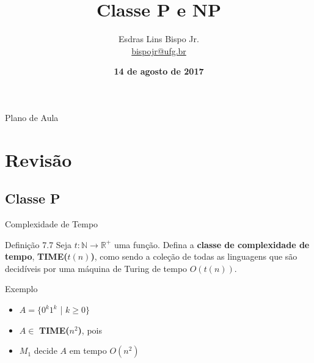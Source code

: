 \documentclass[xcolor=dvipsnames,table]{beamer}
\title{Classe P e NP}
\author{
  Esdras Lins Bispo Jr. \\ \url{bispojr@ufg.br}
  }
\institute{
  Teoria da Computação \\Bacharelado em Ciência da Computação}
\date{\textbf{14 de agosto de 2017} }
\begin{document}
	\begin{frame}
		\titlepage
	\end{frame}

	\AtBeginSection{
		\begin{frame}{Sumário}%
    		\tableofcontents[currentsection]
		\end{frame}
	}

	\begin{frame}{Plano de Aula}
		\tableofcontents
	\end{frame}
    
    \section{Revisão}
	\subsection{Classe P}	
	\begin{frame}{Complexidade de Tempo}
		\begin{block}{Definição 7.7}
			Seja $t: \mathbb{N} \rightarrow \mathbb{R}^+$ uma função. Defina a {\bf classe de complexidade de tempo}, {\bf TIME($t(n)$)}, como sendo a coleção de todas as linguagens que são decidíveis por uma máquina de Turing de tempo $O(t(n))$.
		\end{block}   
		\begin{block}{Exemplo}
			\begin{itemize}
				\item $A = \{ 0^k 1^k$ | $k \geq 0 \}$
				\item $A \in$ {\bf TIME($n^2$)}, pois   
				\item $M_1$ decide $A$ em tempo $O(n^2)$
			\end{itemize}
		\end{block}
	\end{frame}
	
\end{document}
